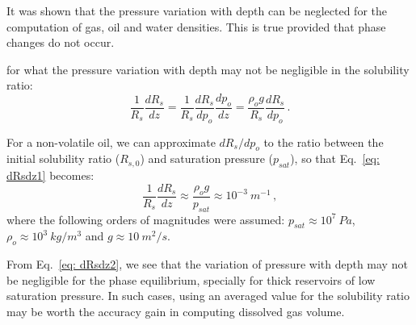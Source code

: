 \documentclass[final,authoryear,5p,twocolumn,10pt]{elsarticle}
\begin{document}
It was shown that the pressure variation with depth can be neglected for the computation of gas, oil and water densities. This is true provided that phase changes do not occur. 

 for what the pressure variation with depth may not be negligible in the solubility ratio: 
\begin{equation}\label{eq: dRsdz1}
\frac{1}{R_s}\frac{d R_s}{dz} = \frac{1}{R_s}\frac{d R_s}{dp_o} \frac{dp_o}{dz} = \frac{\rho_o g}{R_s}\frac{dR_s}{dp_o} \, .
\end{equation}

For a non-volatile oil, we can approximate $dR_s / dp_o$ to the ratio between the initial solubility ratio ($R_{s,0}$) and saturation pressure ($p_{sat}$), so that Eq.~\eqref{eq: dRsdz1} becomes:
\begin{equation}\label{eq: dRsdz2}
\frac{1}{R_s}\frac{d R_s}{dz} \approx \frac{\rho_o g }{p_{sat}} \approx 10^{-3}\ m^{-1} \, ,
\end{equation}
where the following orders of magnitudes were assumed: $p_{sat} \approx 10^{7}\ Pa$, $\rho_o \approx 10^{3}\ kg/m^3$ and $g \approx 10\ m^2/s$. 

From Eq.~\eqref{eq: dRsdz2}, we see that the variation of pressure with depth may not be negligible for the phase equilibrium,  specially for thick reservoirs of low saturation pressure. In such cases, using an averaged value for the solubility ratio may be worth the accuracy gain in computing dissolved gas volume.




\end{document}
